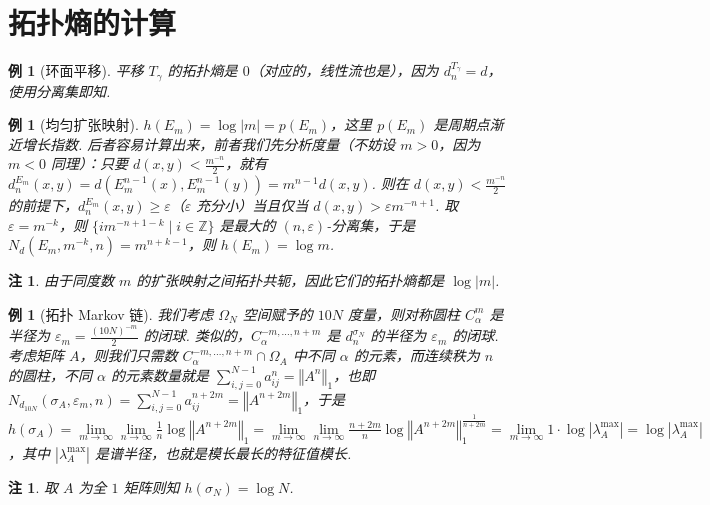 \documentclass[11pt, a4paper, oneside]{ctexart}
\newtheorem{example}[theorem]{例}
\newtheorem{remark}[theorem]{注}
\newcommand{\Z}{\mathbb{Z}}
\newcommand{\abs}[1]{\left|{#1}\right|}
\newcommand{\norm}[1]{\left\Vert{#1}\right\Vert}
\begin{document}
    \section{拓扑熵的计算}
    \begin{example}[环面平移]
        平移 $T_{\gamma}$ 的拓扑熵是 $0$（对应的，线性流也是），因为 $d_n^{T_{\gamma}}=d$，使用分离集即知.
    \end{example}

    \begin{example}[均匀扩张映射]
        $h(E_m)=\log\abs{m}=p(E_m)$，这里 $p(E_m)$ 是周期点渐近增长指数. 后者容易计算出来，前者我们先分析度量（不妨设 $m>0$，因为 $m<0$ 同理）：只要 $d(x,y)<\frac{m^{-n}}{2}$，就有 $d_n^{E_m}(x,y)=d(E_m^{n-1}(x),E_m^{n-1}(y))=m^{n-1}d(x,y)$. 则在 $d(x,y)<\frac{m^{-n}}{2}$ 的前提下，$d_n^{E_m}(x,y)\geq \varepsilon$（$\varepsilon$ 充分小）当且仅当 $d(x,y)>\varepsilon m^{-n+1}$. 取 $\varepsilon=m^{-k}$，则 $\{im^{-n+1-k}\mid i\in\Z\}$ 是最大的 $(n,\varepsilon)$-分离集，于是 $N_d(E_m,m^{-k},n)=m^{n+k-1}$，则 $h(E_m)=\log m$.
    \end{example}
    \begin{remark}
        由于同度数 $m$ 的扩张映射之间拓扑共轭，因此它们的拓扑熵都是 $\log\abs{m}$.
    \end{remark}

    \begin{example}[拓扑 Markov 链]
        我们考虑 $\Omega_N$ 空间赋予的 $10N$ 度量，则对称圆柱 $C_{\alpha}^m$ 是半径为 $\varepsilon_m=\frac{{(10N)}^{-m}}{2}$ 的闭球. 类似的，$C_{\alpha}^{-m,\ldots,n+m}$ 是 $d_n^{\sigma_N}$ 的半径为 $\varepsilon_m$ 的闭球. 考虑矩阵 $A$，则我们只需数 $C_{\alpha}^{-m,\ldots,n+m}\cap \Omega_A$ 中不同 $\alpha$ 的元素，而连续秩为 $n$ 的圆柱，不同 $\alpha$ 的元素数量就是 $\sum\limits_{i,j=0}^{N-1}a_{ij}^n=\norm{A^n}_1$，也即 $N_{d_{10N}}(\sigma_A,\varepsilon_m,n)=\sum\limits_{i,j=0}^{N-1}a_{ij}^{n+2m}=\norm{A^{n+2m}}_1$，于是 $h(\sigma_A)=\lim\limits_{m\to\infty}\lim\limits_{n\to\infty}\frac{1}{n}\log\norm{A^{n+2m}}_1=\lim\limits_{m\to\infty}\lim\limits_{n\to\infty}\frac{n+2m}{n}\log\norm{A^{n+2m}}_1^{\frac{1}{n+2m}}=\lim\limits_{m\to\infty}1\cdot \log\abs{\lambda_A^{\max}}=\log\abs{\lambda_A^{\max}}$，其中 $\abs{\lambda_A^{\max}}$ 是谱半径，也就是模长最长的特征值模长.
    \end{example}
    \begin{remark}
        取 $A$ 为全 $1$ 矩阵则知 $h(\sigma_N)=\log N$.
    \end{remark}
\end{document}
